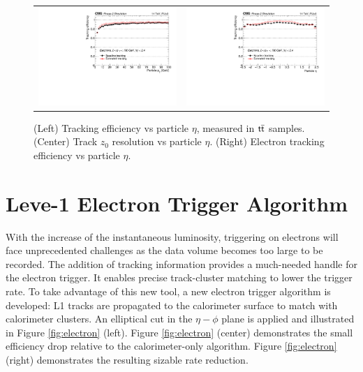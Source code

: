  \begin{figure}[tbh!]
 \begin{center}
  \begin{tabular}{cc}
   \includegraphics[width=.45\linewidth]{figures/Part2/Upgrade/L1TK_elec-pu0_eff_pt}&
   \includegraphics[width=.45\linewidth]{figures/Part2/Upgrade/L1TK_elec-pu0_eff_eta}
  \end{tabular}
  \caption{(Left) Tracking efficiency vs particle $\eta$, measured in $\textsf{t}\overline{\textsf{t}}$ samples. (Center) Track $z_0$ resolution vs particle $\eta$. (Right) Electron tracking efficiency vs particle $\eta$.}
 \label{fig:electronperformance}
 \end{center}
\end{figure} 

\section{Leve-1 Electron Trigger Algorithm}
\label{sec:L1Ele}

With the increase of the instantaneous luminosity, triggering on electrons will face unprecedented challenges as the data volume becomes too large to be recorded. The addition of tracking information provides a much-needed handle for the electron trigger. It enables precise track-cluster matching to lower the trigger rate. To take advantage of this new tool, a new electron trigger algorithm is developed: L1 tracks are propagated to the calorimeter surface to match with calorimeter clusters. An elliptical cut in the $\eta-\phi$ plane is applied and illustrated in Figure \ref{fig:electron} (left). Figure \ref{fig:electron} (center) demonstrates the small efficiency drop relative to the calorimeter-only algorithm. Figure \ref{fig:electron} (right) demonstrates the resulting sizable rate reduction.  
  
